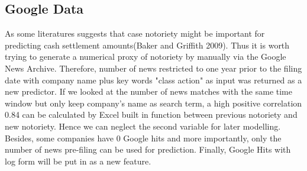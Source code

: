 \subsection{Google Data}
As some literatures suggests that case notoriety might be important for predicting cash settlement amounts(Baker and Griffith 2009). Thus it is worth trying to generate a numerical proxy of notoriety by manually via the Google News Archive. Therefore, number of news restricted to one year prior to the filing date with company name plus key words "class action" as input was returned as a new predictor. If we looked at the number of news matches with the same time window but only keep company's name as search term, a high positive correlation 0.84 can be calculated by Excel built in function between previous notoriety and new notoriety. Hence we can neglect the second variable for later modelling. Besides, some companies have 0 Google hits and more importantly, only the number of news pre-filing can be used for prediction. Finally, Google Hits with log form will be put in as a new feature. 

